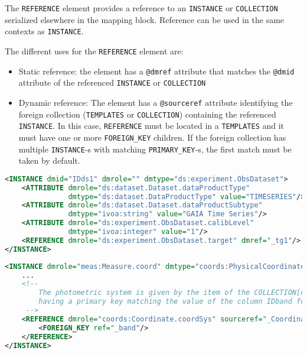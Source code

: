 The \texttt{REFERENCE} element provides a reference to an \texttt{INSTANCE} or \texttt{COLLECTION} serialized elsewhere in the mapping block.
Reference can be used in the same contexts as \texttt{INSTANCE}.

The different uses for the \texttt{REFERENCE} element are:

\begin{itemize}
    \item Static reference: the element has a \texttt{@dmref} attribute that matches the \texttt{@dmid} attribute of the referenced \texttt{INSTANCE} or \texttt{COLLECTION} 
    \item Dynamic reference: The element has a \texttt{@sourceref} attribute identifying the foreign collection (\texttt{TEMPLATES} or \texttt{COLLECTION}) 
    containing the referenced \texttt{INSTANCE}.
             In this case, \texttt{REFERENCE} must be located in a \texttt{TEMPLATES} and it must have one or more \texttt{FOREIGN\_KEY} children. 
             If the foreign collection has multiple \texttt{INSTANCE}-s with matching \texttt{PRIMARY\_KEY}-s, the first match must be taken by default.
\end{itemize}

\begin{lstlisting}[caption={Simple \texttt{REFERENCE}, to be replaced with the \texttt{INSTANCE} having \texttt{@dmid=\_tg1} (see line~\ref{REFERENCE_snippet_1} in Appendix~\ref{appendix_A}).},language=XML]
<INSTANCE dmid="IDds1" dmrole="" dmtype="ds:experiment.ObsDataset">
    <ATTRIBUTE dmrole="ds:dataset.Dataset.dataProductType" 
               dmtype="ds:dataset.DataProductType" value="TIMESERIES"/>
    <ATTRIBUTE dmrole="ds:dataset.Dataset.dataProductSubtype" 
               dmtype="ivoa:string" value="GAIA Time Series"/>
    <ATTRIBUTE dmrole="ds:experiment.ObsDataset.calibLevel" 
               dmtype="ivoa:integer" value="1"/>
    <REFERENCE dmrole="ds:experiment.ObsDataset.target" dmref="_tg1"/>
</INSTANCE>

\end{lstlisting}

\begin{lstlisting}[caption={Dynamic \texttt{REFERENCE}, 
                            to be replaced with the \texttt{INSTANCE} of the collection \texttt{\_CoordinateSystems} 
                            and having a \texttt{PRIMARY\_KEY} matching the value of the column  \texttt{\_band}.
                            This pattern is valid in the context of a TEMPLATES
                            (see line~\ref{REFERENCE_snippet_2}).},language=XML]
<INSTANCE dmrole="meas:Measure.coord" dmtype="coords:PhysicalCoordinate">
    ...
    <!--
        The photometric system is given by the item of the COLLECTION[dmid=IDCoordinateSystems]
        having a primary key matching the value of the column IDband for that particular row
     -->
    <REFERENCE dmrole="coords:Coordinate.coordSys" sourceref="_CoordinateSystems">
        <FOREIGN_KEY ref="_band"/>
    </REFERENCE>
</INSTANCE>
\end{lstlisting}

